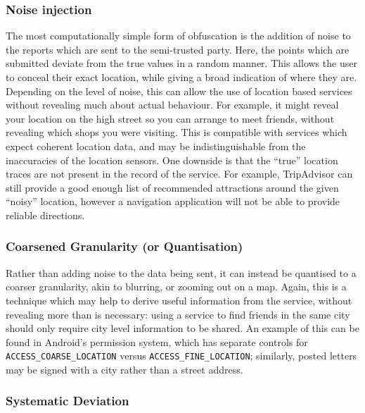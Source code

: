 \documentclass{IOS-Book-Article}     %
\newcommand{\tbox}[3][red]{{
\color{#1}\noindent{
   \fbox{\scriptsize{ {\bf #2} \textsl{#3}}}
   \vspace{2pt}
}
}}
\newcommand{\todo}[1]{\tbox{TODO:}{#1}}
\begin{document}
\subsubsection{Noise injection}

The most computationally simple form of obfuscation is the addition of noise to
the reports which are sent to the semi-trusted party. Here, the points which are
submitted deviate from the true values in a random manner. This allows the user
to conceal their exact location, while giving a broad indication of where they
are. Depending on the level of noise, this can allow the use of location
based services without revealing much about actual behaviour. For example, it
might reveal your location on the high street so you can arrange to meet
friends, without revealing which shops you were visiting. This is compatible
with services which expect coherent location data, and may be indistinguishable
from the inaccuracies of the location sensors. One downside is that the ``true''
location traces are not present in the record of the service.
For example, TripAdvisor can still provide a good enough list of recommended 
attractions around the given ``noisy'' location, however a navigation 
application will not be able to provide reliable directions.

\subsubsection{Coarsened Granularity (or Quantisation)}

Rather than adding noise to the data being sent, it can instead be quantised to
a coarser granularity, akin to blurring, or zooming out on a map. Again, this is
a technique which may help to derive useful information from the service,
without revealing more than is necessary: using a service to find friends in the
same city should only require city level information to be shared. An example of
this can be found in Android's permission system, which has separate controls
for \verb|ACCESS_COARSE_LOCATION| versus \verb|ACCESS_FINE_LOCATION|; similarly,
posted letters may be signed with a city rather than a street address.

\subsubsection{Systematic Deviation}
\end{document}
